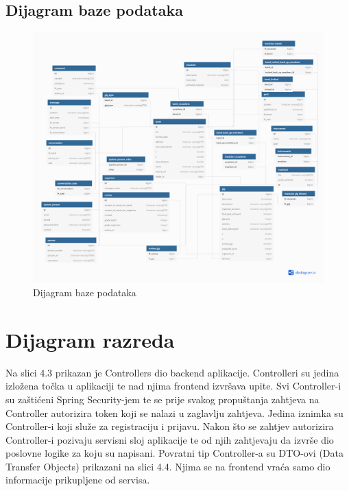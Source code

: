 		
	

			
			\subsection{Dijagram baze podataka}
			
			\begin{figure}[H]
			\begin{center}
				\includegraphics[width=17cm]{slike/ERModel.PNG}
			\end{center}
			\caption{Dijagram baze podataka}
			\label{fig:dijagramBaze}
		\end{figure}
			
			
			
		\section{Dijagram razreda}

			Na slici 4.3 prikazan je Controllers dio backend aplikacije. Controlleri su jedina izložena točka u aplikaciji te nad njima frontend izvršava upite. Svi Controller-i su zaštićeni Spring Security-jem te se prije svakog propuštanja zahtjeva na Controller autorizira token koji se nalazi u zaglavlju zahtjeva. Jedina iznimka su Controller-i koji služe za registraciju i prijavu. Nakon što se zahtjev autorizira Controller-i pozivaju servisni sloj aplikacije te od njih zahtjevaju da izvrše dio poslovne logike za koju su napisani. Povratni tip Controller-a su DTO-ovi (Data Transfer Objects) prikazani na slici 4.4. Njima se na frontend vraća samo dio informacije prikupljene od servisa.  

